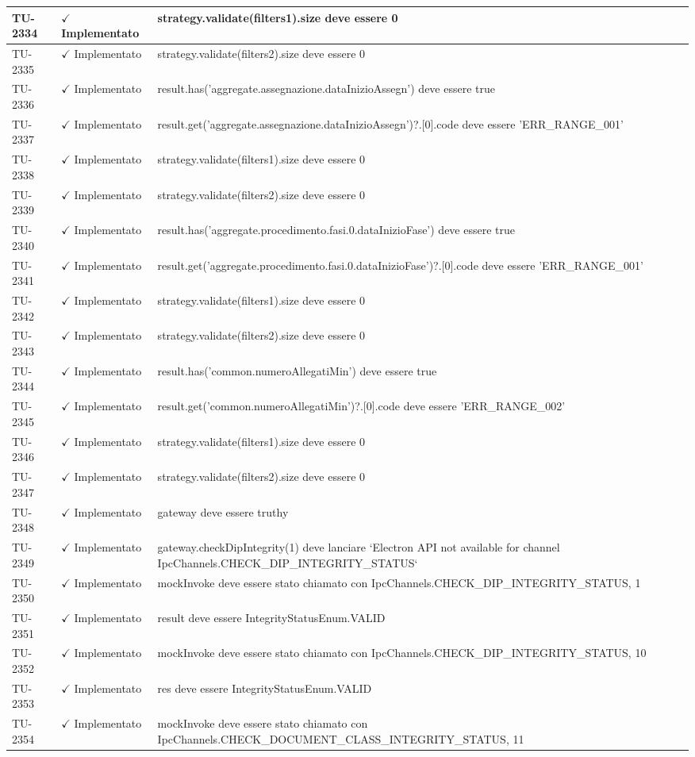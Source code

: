 ﻿\documentclass[a4paper,12pt]{article}
\newcommand{\ok}{\textcolor{green!60!black}{$\checkmark$ Implementato}}
\begin{document}
\begin{longtable}{|p{2cm}|p{3.5cm}|p{9.5cm}|}
\hline
TU-2334 & \ok & strategy.validate(filters1).size deve essere 0 \\
\hline
TU-2335 & \ok & strategy.validate(filters2).size deve essere 0 \\
\hline
TU-2336 & \ok & result.has('aggregate.assegnazione.dataInizioAssegn') deve essere true \\
\hline
TU-2337 & \ok & result.get('aggregate.assegnazione.dataInizioAssegn')?.[0].code deve essere 'ERR\_RANGE\_001' \\
\hline
TU-2338 & \ok & strategy.validate(filters1).size deve essere 0 \\
\hline
TU-2339 & \ok & strategy.validate(filters2).size deve essere 0 \\
\hline
TU-2340 & \ok & result.has('aggregate.procedimento.fasi.0.dataInizioFase') deve essere true \\
\hline
TU-2341 & \ok & result.get('aggregate.procedimento.fasi.0.dataInizioFase')?.[0].code deve essere 'ERR\_RANGE\_001' \\
\hline
TU-2342 & \ok & strategy.validate(filters1).size deve essere 0 \\
\hline
TU-2343 & \ok & strategy.validate(filters2).size deve essere 0 \\
\hline
TU-2344 & \ok & result.has('common.numeroAllegatiMin') deve essere true \\
\hline
TU-2345 & \ok & result.get('common.numeroAllegatiMin')?.[0].code deve essere 'ERR\_RANGE\_002' \\
\hline
TU-2346 & \ok & strategy.validate(filters1).size deve essere 0 \\
\hline
TU-2347 & \ok & strategy.validate(filters2).size deve essere 0 \\
\hline
TU-2348 & \ok & gateway deve essere truthy \\
\hline
TU-2349 & \ok & gateway.checkDipIntegrity(1) deve lanciare `Electron API not available for channel IpcChannels.CHECK\_DIP\_INTEGRITY\_STATUS` \\
\hline
TU-2350 & \ok & mockInvoke deve essere stato chiamato con IpcChannels.CHECK\_DIP\_INTEGRITY\_STATUS, 1 \\
\hline
TU-2351 & \ok & result deve essere IntegrityStatusEnum.VALID \\
\hline
TU-2352 & \ok & mockInvoke deve essere stato chiamato con IpcChannels.CHECK\_DIP\_INTEGRITY\_STATUS, 10 \\
\hline
TU-2353 & \ok & res deve essere IntegrityStatusEnum.VALID \\
\hline
TU-2354 & \ok & mockInvoke deve essere stato chiamato con IpcChannels.CHECK\_DOCUMENT\_CLASS\_INTEGRITY\_STATUS, 11 \\

\end{longtable}
\end{document}
